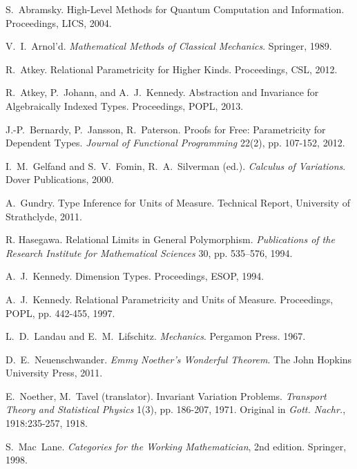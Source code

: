 \documentclass[preprint]{sigplanconf}
\theoremstyle{examplestyle}
\begin{document}
\begin{thebibliography}{12}
\softraggedright

S.~Abramsky. High-Level Methods for Quantum Computation and Information.
Proceedings, LICS, 2004.

 V.~I.~Arnol'd. {\em Mathematical Methods of
  Classical Mechanics}. Springer, 1989.

R.~Atkey. Relational Parametricity for Higher Kinds.
Proceedings, CSL, 2012.

R.~Atkey, P.~Johann, and A.~J.~Kennedy. Abstraction and Invariance for Algebraically Indexed Types.
Proceedings, POPL, 2013.

J.-P.~Bernardy, P.~Jansson, R.~Paterson.
Proofs for Free: Parametricity for Dependent Types.
{\em Journal of Functional Programming} 22(2), pp. 107-152, 2012.

 I.~M.~Gelfand and S.~V.~Fomin,
  R.~A.~Silverman (ed.). {\em Calculus of Variations}. Dover Publications,
  2000.

 A.~Gundry. Type Inference for Units of
  Measure. Technical Report, University of Strathclyde, 2011.

 R. Hasegawa.  Relational Limits in
  General Polymorphism.  {\em Publications of the Research Institute
    for Mathematical Sciences} 30, pp. 535--576, 1994.

A.~J.~Kennedy. Dimension Types.
Proceedings, ESOP, 1994.

A.~J.~Kennedy. Relational Parametricity and Units of Measure.
Proceedings, POPL, pp. 442-455, 1997.

 L.~D.~Landau and
  E.~M.~Lifschitz. {\em Mechanics}. Pergamon Press. 1967.

D.~E.~Neuenschwander. {\em Emmy Noether's Wonderful Theorem}.
The John Hopkins University Press, 2011.

 E.~Noether, M.~Tavel (translator). Invariant
  Variation Problems.  {\em Transport Theory and Statistical Physics}
  1(3), pp. 186-207, 1971. Original in {\em Gott. Nachr.},
  1918:235-257, 1918.

 S.~Mac~Lane. {\em Categories for the Working
  Mathematician}, 2nd edition. Springer, 1998.


\end{thebibliography}
\end{document}
